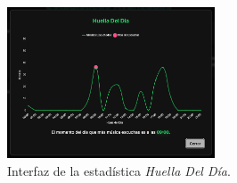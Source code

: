 \begin{figure}[H]
  \centering
  \vspace{-10pt}
  \includegraphics[width=0.55\textwidth]{figures/capturas_ui/huella_del_dia.png}
  \caption{Interfaz de la estadística \textit{Huella Del Día}.}
  \label{fig:huella_del_dia}
\end{figure}

